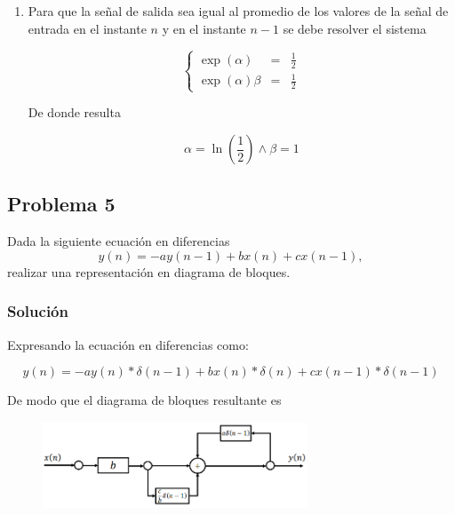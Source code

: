 \documentclass[a4paper,12pt,final]{article}
\begin{document}
\begin{enumerate}[label=\alph*)]
        \item Para que la señal de salida sea igual al promedio de los valores de la señal de entrada en el instante $n$
          y en el instante $n-1$ se debe resolver el sistema

          \begin{equation}
            \left\{
              \begin{array}{ccc}
                \exp\left(\alpha\right)      &=&  \displaystyle{\frac{1}{2}} \\[1em]
                \exp\left(\alpha\right)\beta &=&  \displaystyle{\frac{1}{2}}
              \end{array}
            \right.
          \end{equation}

          \noindent De donde resulta

          $$ \alpha = \ln\left(\frac{1}{2}\right) \wedge \beta = 1$$
      \end{enumerate}

  \newpage
  \subsection*{Problema 5}
    \noindent Dada la siguiente ecuación en diferencias
    $$y\left(n\right) = -a y\left(n-1\right) + b x\left(n\right) + c x\left(n-1\right),$$
    realizar una representación en diagrama de bloques.

    \subsubsection*{Solución}
      \noindent Expresando la ecuación en diferencias como:

      $$y\left(n\right) = -a y\left(n\right) * \delta\left(n-1\right) + b x\left(n\right) * \delta\left(n\right) + c x\left(n-1\right) * \delta\left(n-1\right)$$

      \noindent De modo que el diagrama de bloques resultante es

      \begin{figure}[H]
        \begin{center}
          \includegraphics[width=0.7\textwidth]{./laboratorio_3/problema05_diagram.png}
        \end{center}
      \end{figure}
\end{document}
